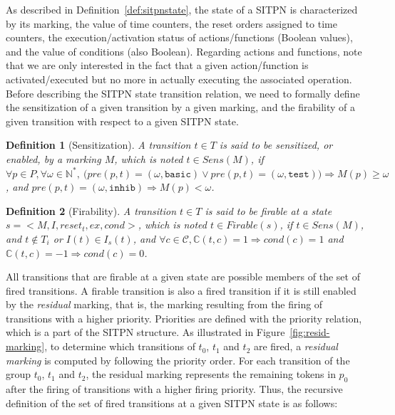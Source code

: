 \documentclass[pdflatex,sn-mathphys]{sn-jnl}%
\theoremstyle{thmstyleone}%
\theoremstyle{thmstyletwo}%
\theoremstyle{thmstylethree}%
\newtheorem{definition}{Definition}%
\begin{document}
As described in Definition~\ref{def:sitpnstate}, the state of a SITPN
is characterized by its marking, the value of time counters, the reset
orders assigned to time counters, the execution/activation status of
actions/functions (Boolean values), and the value of conditions (also
Boolean). Regarding actions and functions, note that we are only
interested in the fact that a given action/function is
activated/executed but no more in actually executing the associated
operation.\\

Before describing the SITPN state transition relation, we need to
formally define the sensitization of a given transition by a given
marking, and the firability of a given transition with respect to a
given SITPN state.

\begin{definition}[Sensitization]
  \label{def:sens}
  A transition $t\in{}T$ is said to be sensitized, or enabled, by a
  marking $M$, which is noted $t\in{}Sens(M)$, if
  $\forall{}p\in{}P,\forall\omega\in\mathbb{N}^{*},~\big(pre(p,t)=(\omega,\mathtt{basic})\vee{}pre(p,t)=(\omega,\mathtt{test})\big)\Rightarrow{}M(p)\ge{}\omega$,
  and $pre(p,t)=(\omega,\mathtt{inhib})\Rightarrow{}M(p)<{}\omega$.
\end{definition}

\begin{definition}[Firability]
  \label{def:firable}
  A transition $t\in{}T$ is said to be firable at a state
  $s={<}M,I,reset_t,ex,cond{>}$, which is noted $t\in{}Firable(s)$, if
  $t\in{}Sens(M)$, and $t\notin{}T_i$ or $I(t)\in{}I_s(t)$, and
  $\forall c \in \mathcal{C}, \mathbb{C}(t, c) = 1 \Rightarrow cond(c)
  = 1$ and $\mathbb{C}(t, c) = -1 \Rightarrow cond(c) = 0$.
\end{definition}


All transitions that are firable at a given state are possible members
of the set of fired transitions. A firable transition is also a fired
transition if it is still enabled by the \textit{residual} marking,
that is, the marking resulting from the firing of transitions with a
higher priority.  Priorities are defined with the priority relation,
which is a part of the SITPN structure.  As illustrated in
Figure~\ref{fig:resid-marking}, to determine which transitions of
$t_0$, $t_1$ and $t_2$ are fired, a \emph{residual marking} is
computed by following the priority order. For each transition of the
group $t_0$, $t_1$ and $t_2$, the residual marking represents the
remaining tokens in $p_0$ after the firing of transitions with a
higher firing priority.  Thus, the recursive definition of the set of
fired transitions at a given SITPN state is as follows:
\end{document}
